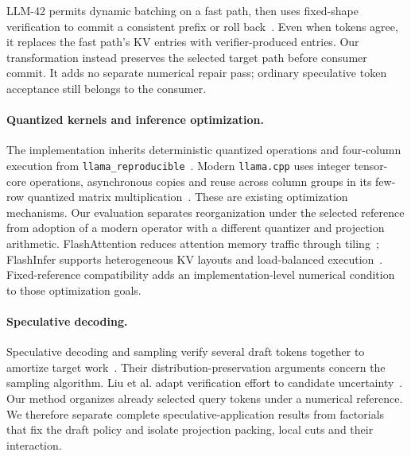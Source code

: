 LLM-42 permits dynamic batching on a fast path, then uses fixed-shape verification to commit a consistent prefix or roll back~\cite{llm42}. Even when tokens agree, it replaces the fast path's KV entries with verifier-produced entries. Our transformation instead preserves the selected target path before consumer commit. It adds no separate numerical repair pass; ordinary speculative token acceptance still belongs to the consumer.

\paragraph{Quantized kernels and inference optimization.}
The implementation inherits deterministic quantized operations and four-column execution from \texttt{llama\_reproducible}~\cite{loop4code}. Modern \texttt{llama.cpp} uses integer tensor-core operations, asynchronous copies and reuse across column groups in its few-row quantized matrix multiplication~\cite{llama_cpp_fewrow}. These are existing optimization mechanisms. Our evaluation separates reorganization under the selected reference from adoption of a modern operator with a different quantizer and projection arithmetic. FlashAttention reduces attention memory traffic through tiling~\cite{flashattention}; FlashInfer supports heterogeneous KV layouts and load-balanced execution~\cite{flashinfer}. Fixed-reference compatibility adds an implementation-level numerical condition to those optimization goals.

\paragraph{Speculative decoding.}
Speculative decoding and sampling verify several draft tokens together to amortize target work~\cite{leviathan2023,chen2023}. Their distribution-preservation arguments concern the sampling algorithm. Liu et al. adapt verification effort to candidate uncertainty~\cite{liu2026heterospec}. Our method organizes already selected query tokens under a numerical reference. We therefore separate complete speculative-application results from factorials that fix the draft policy and isolate projection packing, local cuts and their interaction.
